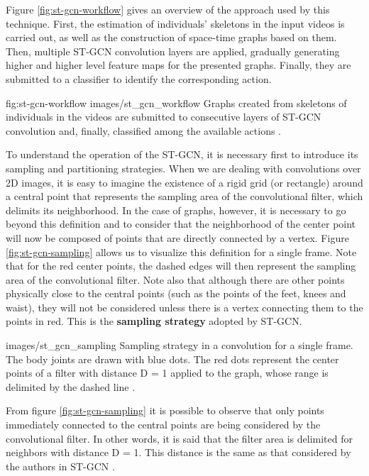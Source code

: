 Figure \ref{fig:st-gcn-workflow} gives an overview of the approach used by this technique. First, the estimation of individuals' skeletons in the input videos is carried out, as well as the construction of space-time graphs based on them. Then, multiple ST-GCN convolution layers are applied, gradually generating higher and higher level feature maps for the presented graphs. Finally, they are submitted to a classifier to identify the corresponding action.

\image
    {fig:st-gcn-workflow}
    {images/st_gcn_workflow}
    {Graphs created from skeletons of individuals in the videos are submitted to consecutive layers of ST-GCN convolution and, finally, classified among the available actions \cite[p. 3]{st-gcn-2018}.}

To understand the operation of the ST-GCN, it is necessary first to introduce its sampling and partitioning strategies. When we are dealing with convolutions over 2D images, it is easy to imagine the existence of a rigid grid (or rectangle) around a central point that represents the sampling area of the convolutional filter, which delimits its neighborhood. In the case of graphs, however, it is necessary to go beyond this definition and to consider that the neighborhood of the center point will now be composed of points that are directly connected by a vertex. Figure \ref{fig:st-gcn-sampling} allows us to visualize this definition for a single frame. Note that for the red center points, the dashed edges will then represent the sampling area of the convolutional filter. Note also that although there are other points physically close to the central points (such as the points of the feet, knees and waist), they will not be considered unless there is a vertex connecting them to the points in red. This is the \textbf{sampling strategy} adopted by ST-GCN.

    {images/st_gcn_sampling}
    {Sampling strategy in a convolution for a single frame. The body joints are drawn with blue dots. The red dots represent the center points of a filter with distance D = 1 applied to the graph, whose range is delimited by the dashed line \cite[p. 5]{st-gcn-2018}.}

From figure \ref{fig:st-gcn-sampling} it is possible to observe that only points immediately connected to the central points are being considered by the convolutional filter. In other words, it is said that the filter area is delimited for neighbors with distance D = 1. This distance is the same as that considered by the authors in ST-GCN \cite{st-gcn-2018}.


